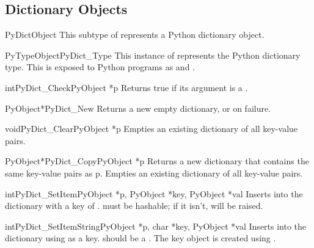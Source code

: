 \documentclass{manual}
\begin{document}


\subsection{Dictionary Objects \label{dictObjects}}

\begin{ctypedesc}{PyDictObject}
This subtype of  represents a Python dictionary object.
\end{ctypedesc}

\begin{cvardesc}{PyTypeObject}{PyDict_Type}
This instance of  represents the Python dictionary 
type.  This is exposed to Python programs as  and 
.
\end{cvardesc}

\begin{cfuncdesc}{int}{PyDict_Check}{PyObject *p}
Returns true if its argument is a .
\end{cfuncdesc}

\begin{cfuncdesc}{PyObject*}{PyDict_New}{}
Returns a new empty dictionary, or \NULL{} on failure.
\end{cfuncdesc}

\begin{cfuncdesc}{void}{PyDict_Clear}{PyObject *p}
Empties an existing dictionary of all key-value pairs.
\end{cfuncdesc}

\begin{cfuncdesc}{PyObject*}{PyDict_Copy}{PyObject *p}
Returns a new dictionary that contains the same key-value pairs as p.
Empties an existing dictionary of all key-value pairs.
\end{cfuncdesc}

\begin{cfuncdesc}{int}{PyDict_SetItem}{PyObject *p, PyObject *key,
                                       PyObject *val}
Inserts  into the dictionary with a key of .
 must be hashable; if it isn't,  will be 
raised.
\end{cfuncdesc}

\begin{cfuncdesc}{int}{PyDict_SetItemString}{PyObject *p,
            char *key,
            PyObject *val}
Inserts  into the dictionary using 
as a key.  should be a .  The key object is
created using .
\end{cfuncdesc}
\end{document}
